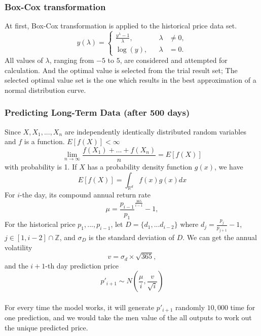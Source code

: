 \documentclass[12pt]{article}
\begin{document}
\subsubsection{Box-Cox transformation}
At first, Box-Cox transformation is applied to the historical price data set.
\begin{equation}
    y(\lambda)=\left\{
            \begin{aligned}
                \frac{y^\lambda-1}{\lambda},& &\lambda &\neq 0,\\
                \log(y),&&\lambda&=0.
            \end{aligned}
        \right.
\end{equation}
All values of $\lambda$, ranging from $-5$ to $5$, are considered and attempted for calculation. And the optimal value is selected from the trial result set; The selected optimal value set is the one which results in the best approximation of a normal distribution curve.

\subsubsection{Predicting Long-Term Data (after 500 days)}
Since $X,X_1,...,X_n$ are independently identically distributed random variables and $f$ is a function. $E[f(X)]<\infty$
\begin{equation}
    \lim_{n\rightarrow \infty}\frac{f(X_1)+...+f(X_n)}{n}=E[f(X)]
\end{equation}
with probability is 1. If $X$ has a probability density function $g(x)$, we have\begin{equation}
    E[f(X)]=\int_{\mathbb{R}^d}f(x)g(x)dx
\end{equation}
For $i$-the day, its compound annual return rate 
\begin{equation}
    \mu={\frac{p_{i-1}}{p_1}}^{\frac{365}{i-1}}-1,
\end{equation}
For the historical price $p_1,...,p_{i-1}$, let $D=\{d_1,...d_{i-2}\}$ where $d_j=\frac{p_j}{p_{j+1}}-1$, $j \in [1,i-2]\cap\mathbb{Z}$, and $\sigma_D$ is the standard deviation of $D$. We can get the annual volatility 
\begin{equation}
    v=\sigma_d\times\sqrt{365},
\end{equation}
and the $i+1$-th day prediction price
\begin{equation}
    p'_{i+1}\sim N(\frac{\mu}{i},\frac{v}{\sqrt{i}})
\end{equation}
\paragraph{}
For every time the model works, it will generate $p'_{i+1}$ randomly $10,000$ time for one prediction, and we would take the men value of the all outputs to work out the unique predicted price.
\end{document}
